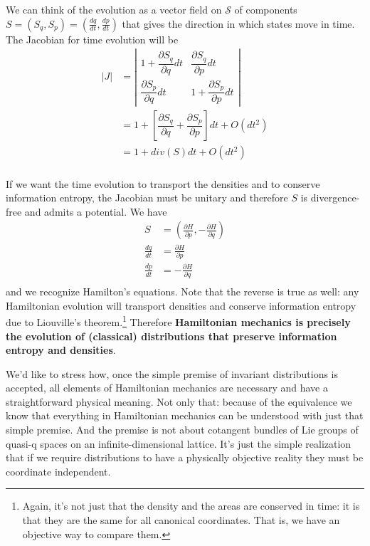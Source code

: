 \documentclass[11pt]{article}
\begin{document}
We can think of the evolution as a vector field on $\mathcal{S}$ of components $S = (S_q, S_p) = (\frac{dq}{dt}, \frac{dp}{dt})$ that gives the direction in which states move in time. The Jacobian for time evolution will be
\begin{equation}
\label{Jacobian_evolution}
\begin{aligned}
|J| &= \left| \begin{matrix}
1 + \dfrac{\partial S_q}{\partial q}dt & \dfrac{\partial S_q}{\partial p} dt \\[2.2ex]
\dfrac{\partial S_p}{\partial q}  dt & 1 + \dfrac{\partial S_p}{\partial p} dt \end{matrix} \right| \\
&= 1 + \left[ \dfrac{\partial S_q}{\partial q} + \dfrac{\partial S_p}{\partial p} \right]dt + O(dt^2)\\
&= 1 + div(S)dt + O(dt^2)\\
\end{aligned}
\end{equation}

If we want the time evolution to transport the densities and to conserve information entropy, the Jacobian must be unitary and therefore $S$ is divergence-free and admits a potential. We have
\begin{equation}
\label{Potential_Hamilton}
\begin{aligned}
S &= \left(\frac{\partial H}{\partial p}, - \frac{\partial H}{\partial q}\right) \\
\frac{dq}{dt} &= \frac{\partial H}{\partial p}  \\
\frac{dp}{dt} &= - \frac{\partial H}{\partial q}  \\
\end{aligned}
\end{equation}
and we recognize Hamilton's equations. Note that the reverse is true as well: any Hamiltonian evolution will transport densities and conserve information entropy due to Liouville's theorem.\footnote{Again, it's not just that the density and the areas are conserved in time: it is that they are the same for all canonical coordinates. That is, we have an objective way to compare them.} Therefore \textbf{Hamiltonian mechanics is precisely the evolution of (classical) distributions that preserve information entropy and densities}.

We'd like to stress how, once the simple premise of invariant distributions is accepted, all elements of Hamiltonian mechanics are necessary and have a straightforward physical meaning. Not only that: because of the equivalence we know that everything in Hamiltonian mechanics can be understood with just that simple premise. And the premise is not about cotangent bundles of Lie groups of quasi-q spaces on an infinite-dimensional lattice. It's just the simple realization that if we require distributions to have a physically objective reality they must be coordinate independent.
\end{document}
